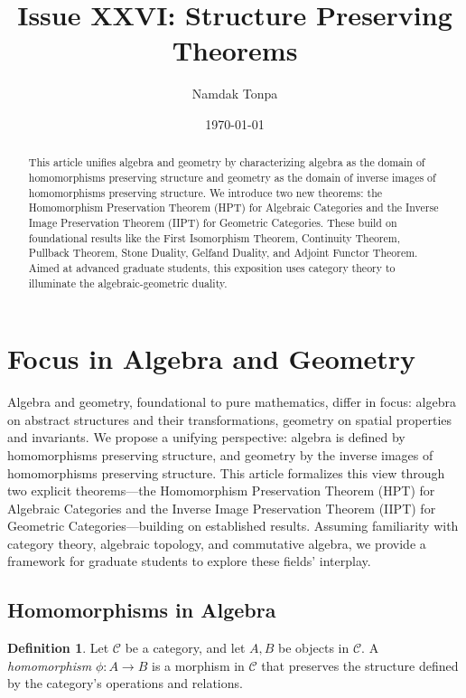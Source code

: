 \documentclass{article}
\theoremstyle{plain}
\theoremstyle{definition}
\newtheorem{definition}{Definition}
\begin{document}
\title{Issue XXVI: Structure Preserving Theorems}
\author{Namdak Tonpa}
\date{\today}


\maketitle

\begin{abstract}
This article unifies algebra and geometry by characterizing algebra as the domain of homomorphisms preserving structure and geometry as the domain of inverse images of homomorphisms preserving structure. We introduce two new theorems: the Homomorphism Preservation Theorem (HPT) for Algebraic Categories and the Inverse Image Preservation Theorem (IIPT) for Geometric Categories. These build on foundational results like the First Isomorphism Theorem, Continuity Theorem, Pullback Theorem, Stone Duality, Gelfand Duality, and Adjoint Functor Theorem. Aimed at advanced graduate students, this exposition uses category theory to illuminate the algebraic-geometric duality.
\end{abstract}

\ifincludeTOC
  \tableofcontents
\fi

\section{Focus in Algebra and Geometry}
Algebra and geometry, foundational to pure mathematics, differ in focus: algebra on abstract structures and their transformations, geometry on spatial properties and invariants. We propose a unifying perspective: algebra is defined by homomorphisms preserving structure, and geometry by the inverse images of homomorphisms preserving structure. This article formalizes this view through two explicit theorems—the Homomorphism Preservation Theorem (HPT) for Algebraic Categories and the Inverse Image Preservation Theorem (IIPT) for Geometric Categories—building on established results. Assuming familiarity with category theory, algebraic topology, and commutative algebra, we provide a framework for graduate students to explore these fields’ interplay.

\subsection{Homomorphisms in Algebra}
\begin{definition}
Let \(\mathcal{C}\) be a category, and let \(A, B\) be objects in \(\mathcal{C}\). A \emph{homomorphism} \(\phi: A \to B\) is a morphism in \(\mathcal{C}\) that preserves the structure defined by the category’s operations and relations.
\end{definition}
\end{document}
